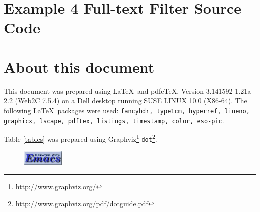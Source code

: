 \documentclass{article}[14pt]
\begin{document}
\newpage
\section{Example 4 Full-text Filter Source Code}



\section{About this document}
\noindent This document was prepared using \LaTeX \ and pdfeTeX, Version
3.141592-1.21a-2.2 (Web2C 7.5.4) on a Dell desktop running SUSE LINUX 10.0
(X86-64). 
The following \LaTeX \  packages were used: {\tt fancyhdr, type1cm, hyperref, lineno, graphicx,
lscape, pdftex, listings, timestamp, color, eso-pic}.

\noindent Table \ref{tables} was prepared using
Graphviz\footnote{http://www.graphviz.org/} {\tt dot}\footnote{http://www.graphviz.org/pdf/dotguide.pdf}.


\begin{figure}[h]
  \begin{center}
\vspace*{5mm}
  \href{http://www.gnu.org/software/emacs/}{\includegraphics[width=2cm]{images/emacs.png}}
   \end{center}
\end{figure}

\end{document}
